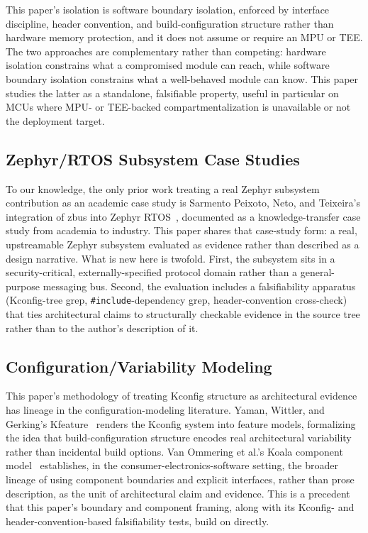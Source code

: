 This paper's isolation is software boundary isolation, enforced by interface discipline, header convention, and build-configuration structure rather than hardware memory protection, and it does not assume or require an MPU or TEE. The two approaches are complementary rather than competing: hardware isolation constrains what a compromised module can reach, while software boundary isolation constrains what a well-behaved module can know. This paper studies the latter as a standalone, falsifiable property, useful in particular on MCUs where MPU- or TEE-backed compartmentalization is unavailable or not the deployment target.

\subsection{Zephyr/RTOS Subsystem Case Studies}
\label{subsec:related-zephyr}

To our knowledge, the only prior work treating a real Zephyr subsystem contribution as an academic case study is Sarmento Peixoto, Neto, and Teixeira's integration of zbus into Zephyr RTOS~\cite{peixoto2024zbus}, documented as a knowledge-transfer case study from academia to industry. This paper shares that case-study form: a real, upstreamable Zephyr subsystem evaluated as evidence rather than described as a design narrative. What is new here is twofold. First, the subsystem sits in a security-critical, externally-specified protocol domain rather than a general-purpose messaging bus. Second, the evaluation includes a falsifiability apparatus (Kconfig-tree grep, \texttt{\#include}-dependency grep, header-convention cross-check) that ties architectural claims to structurally checkable evidence in the source tree rather than to the author's description of it.

\subsection{Configuration/Variability Modeling}
\label{subsec:related-config}

This paper's methodology of treating Kconfig structure as architectural evidence has lineage in the configuration-modeling literature. Yaman, Wittler, and Gerking's Kfeature~\cite{kfeature2024} renders the Kconfig system into feature models, formalizing the idea that build-configuration structure encodes real architectural variability rather than incidental build options. Van Ommering et al.'s Koala component model~\cite{koala2000} establishes, in the consumer-electronics-software setting, the broader lineage of using component boundaries and explicit interfaces, rather than prose description, as the unit of architectural claim and evidence. This is a precedent that this paper's boundary and component framing, along with its Kconfig- and header-convention-based falsifiability tests, build on directly.

